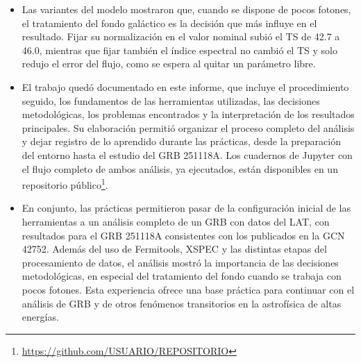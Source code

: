 \begin{itemize}
\item Las variantes del modelo mostraron que, cuando se dispone de pocos fotones, el tratamiento del fondo galáctico es la decisión que más influye en el resultado. Fijar su normalización en el valor nominal subió el TS de 42.7 a 46.0, mientras que fijar también el índice espectral no cambió el TS y solo redujo el error del flujo, como se espera al quitar un parámetro libre.

\item El trabajo quedó documentado en este informe, que incluye el procedimiento seguido, los fundamentos de las herramientas utilizadas, las decisiones metodológicas, los problemas encontrados y la interpretación de los resultados principales. Su elaboración permitió organizar el proceso completo del análisis y dejar registro de lo aprendido durante las prácticas, desde la preparación del entorno hasta el estudio del GRB 251118A. Los cuadernos de Jupyter con el flujo completo de ambos análisis, ya ejecutados, están disponibles en un repositorio público\footnote{\url{https://github.com/USUARIO/REPOSITORIO}}.

\item En conjunto, las prácticas permitieron pasar de la configuración inicial de las herramientas a un análisis completo de un GRB con datos del LAT, con resultados para el GRB 251118A consistentes con los publicados en la GCN 42752. Además del uso de Fermitools, XSPEC y las distintas etapas del procesamiento de datos, el análisis mostró la importancia de las decisiones metodológicas, en especial del tratamiento del fondo cuando se trabaja con pocos fotones. Esta experiencia ofrece una base práctica para continuar con el análisis de GRB y de otros fenómenos transitorios en la astrofísica de altas energías.

\end{itemize}
